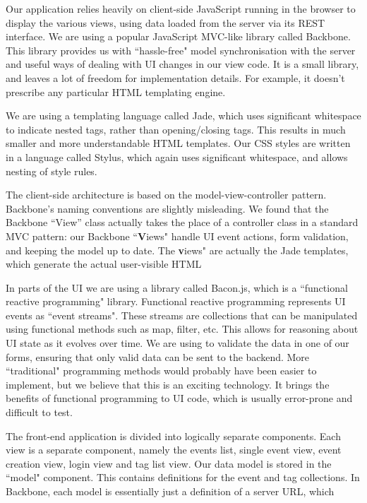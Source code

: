 \documentclass[11pt]{article}
\begin{document}
Our application relies heavily on client-side JavaScript running in the browser to display the various views, using data loaded from the server via its REST interface.
We are using a popular JavaScript MVC-like library called Backbone. This library provides us with ``hassle-free" model synchronisation with the server and useful ways of dealing with UI changes in our view code. It is a small library, and leaves a lot of freedom for implementation details. For example, it doesn't prescribe any particular HTML templating engine.

We are using a templating language called Jade, which uses significant whitespace to indicate nested tags, rather than opening/closing tags. This results in much smaller and more understandable HTML templates. Our CSS styles are written in a language called Stylus, which again uses significant whitespace, and allows nesting of style rules.

The client-side architecture is based on the model-view-controller pattern. Backbone's naming conventions are slightly misleading. We found that the Backbone ``View'' class actually takes the place of a controller class in a standard MVC pattern: our Backbone ``\textbf{V}iews" handle UI event actions, form validation, and keeping the model up to date. The \textbf{v}iews" are actually the Jade templates, which generate the actual user-visible HTML 

In parts of the UI we are using a library called Bacon.js, which is a ``functional reactive programming" library. Functional reactive programming represents UI events as ``event streams". These streams are collections that can be manipulated using functional methods such as map, filter, etc. This allows for reasoning about UI state as it evolves over time. We are using to validate the data in one of our forms, ensuring that only valid data can be sent to the backend. More ``traditional" programming methods would probably have been easier to implement, but we believe that this is an exciting technology. It brings the benefits of functional programming to UI code, which is usually error-prone and difficult to test.

The front-end application is divided into logically separate components. Each view is a separate component, namely the events list, single event view, event creation view, login view and tag list view. Our data model is stored in the ``model" component. This contains definitions for the event and tag collections. In Backbone, each model is essentially just a definition of a server URL, which 
\end{document}
